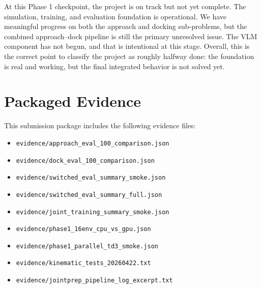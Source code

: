 \documentclass[11pt]{article}
\begin{document}
At this Phase 1 checkpoint, the project is on track but not yet complete. The simulation, training, and evaluation foundation is operational. We have meaningful progress on both the approach and docking sub-problems, but the combined approach--dock pipeline is still the primary unresolved issue. The VLM component has not begun, and that is intentional at this stage. Overall, this is the correct point to classify the project as roughly halfway done: the foundation is real and working, but the final integrated behavior is not solved yet.

\appendix
\section{Packaged Evidence}

This submission package includes the following evidence files:
\begin{itemize}[leftmargin=1.5em]
  \item \texttt{evidence/approach\_eval\_100\_comparison.json}
  \item \texttt{evidence/dock\_eval\_100\_comparison.json}
  \item \texttt{evidence/switched\_eval\_summary\_smoke.json}
  \item \texttt{evidence/switched\_eval\_summary\_full.json}
  \item \texttt{evidence/joint\_training\_summary\_smoke.json}
  \item \texttt{evidence/phase1\_16env\_cpu\_vs\_gpu.json}
  \item \texttt{evidence/phase1\_parallel\_td3\_smoke.json}
  \item \texttt{evidence/kinematic\_tests\_20260422.txt}
  \item \texttt{evidence/jointprep\_pipeline\_log\_excerpt.txt}
\end{itemize}
\end{document}
